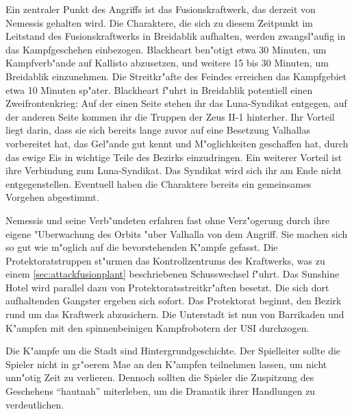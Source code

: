 Ein zentraler Punkt des Angriffs ist das Fusionskraftwerk, das derzeit von Nemessis gehalten wird. Die Charaktere, die sich zu diesem Zeitpunkt im Leitstand des Fusionskraftwerks in Breidablik aufhalten, werden zwangsl"aufig in das Kampfgeschehen einbezogen. Blackheart ben"otigt etwa 30 Minuten, um Kampfverb"ande auf Kallisto abzusetzen, und weitere 15 bis 30 Minuten, um Breidablik einzunehmen. Die Streitkr"afte des Feindes erreichen das Kampfgebiet etwa 10 Minuten sp"ater. Blackheart f"uhrt in Breidablik potentiell einen Zweifrontenkrieg: Auf der einen Seite stehen ihr das Luna-Syndikat entgegen, auf der anderen Seite kommen ihr die Truppen der Zeus II-1 hinterher. Ihr Vorteil liegt darin, dass sie sich bereits lange zuvor auf eine Besetzung Valhallas vorbereitet hat, das Gel"ande gut kennt und M"oglichkeiten geschaffen hat, durch das ewige Eis in wichtige Teile des Bezirks einzudringen. Ein weiterer Vorteil ist ihre Verbindung zum Luna-Syndikat. Das Syndikat wird sich ihr am Ende nicht entgegenstellen. Eventuell haben die Charaktere bereits ein gemeinsames Vorgehen abgestimmt.

Nemessis und seine Verb"undeten erfahren fast ohne Verz"ogerung durch ihre eigene "Uberwachung des Orbits "uber Valhalla von dem Angriff. Sie machen sich so gut wie m"oglich auf die bevorstehenden K"ampfe gefasst. Die Protektoratstruppen st"urmen das Kontrollzentrums des Kraftwerks, was zu einem \cref{sec:attackfusionplant} beschriebenen Schusswechsel f"uhrt. Das Sunshine Hotel wird parallel dazu von Protektoratsstreitkr"aften besetzt. Die sich dort aufhaltenden Gangster ergeben sich sofort. Das Protektorat beginnt, den Bezirk rund um das Kraftwerk abzusichern. Die Unterstadt ist nun von Barrikaden und K"ampfen mit den spinnenbeinigen Kampfrobotern der USI durchzogen.

\begin{remarks}
	Die K"ampfe um die Stadt sind Hintergrundgeschichte. Der Spielleiter sollte die Spieler nicht in gr"o\3erem Ma\3e an den K"ampfen teilnehmen lassen, um nicht unn"otig Zeit zu verlieren. Dennoch sollten die Spieler die Zuspitzung des Geschehens ``hautnah'' miterleben, um die Dramatik ihrer Handlungen zu verdeutlichen.
 \end{remarks}
